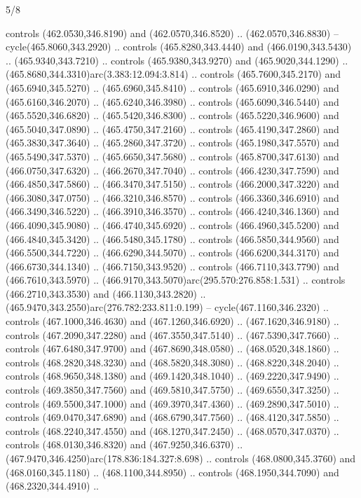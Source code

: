 \begin{flagdescription}{5/8}
\begin{scope}[xshift=0.5\flaglength,yshift=0.5\flagwidth,scale=\flagwidth/475.63]
\begin{scope}[y=0.8pt, x=0.8pt, yscale=-1, xscale=1,shift={(-450,-300)}]
\begin{scope}[cm={{1.0,0.0,0.0,1.0,(-0.0002,0.12556)}},cm={{1.0,0.0,0.0,1.0,(0.00179,0.0)}}]
\begin{scope}[cm={{1.01375,0.0,0.0,1.01375,(-5.36379,-4.94943)}}]
  controls (462.0530,346.8190) and (462.0570,346.8520) .. (462.0570,346.8830) --
  cycle(465.8060,343.2920) .. controls (465.8280,343.4440) and
  (466.0190,343.5430) .. (465.9340,343.7210) .. controls (465.9380,343.9270) and
  (465.9020,344.1290) .. (465.8680,344.3310)arc(3.383:12.094:3.814) .. controls
  (465.7600,345.2170) and (465.6940,345.5270) .. (465.6960,345.8410) .. controls
  (465.6910,346.0290) and (465.6160,346.2070) .. (465.6240,346.3980) .. controls
  (465.6090,346.5440) and (465.5520,346.6820) .. (465.5420,346.8300) .. controls
  (465.5220,346.9600) and (465.5040,347.0890) .. (465.4750,347.2160) .. controls
  (465.4190,347.2860) and (465.3830,347.3640) .. (465.2860,347.3720) .. controls
  (465.1980,347.5570) and (465.5490,347.5370) .. (465.6650,347.5680) .. controls
  (465.8700,347.6130) and (466.0750,347.6320) .. (466.2670,347.7040) .. controls
  (466.4230,347.7590) and (466.4850,347.5860) .. (466.3470,347.5150) .. controls
  (466.2000,347.3220) and (466.3080,347.0750) .. (466.3210,346.8570) .. controls
  (466.3360,346.6910) and (466.3490,346.5220) .. (466.3910,346.3570) .. controls
  (466.4240,346.1360) and (466.4090,345.9080) .. (466.4740,345.6920) .. controls
  (466.4960,345.5200) and (466.4840,345.3420) .. (466.5480,345.1780) .. controls
  (466.5850,344.9560) and (466.5500,344.7220) .. (466.6290,344.5070) .. controls
  (466.6200,344.3170) and (466.6730,344.1340) .. (466.7150,343.9520) .. controls
  (466.7110,343.7790) and (466.7610,343.5970) ..
  (466.9170,343.5070)arc(295.570:276.858:1.531) .. controls (466.2710,343.3530)
  and (466.1130,343.2820) .. (465.9470,343.2550)arc(276.782:233.811:0.199) --
  cycle(467.1160,346.2320) .. controls (467.1000,346.4630) and
  (467.1260,346.6920) .. (467.1620,346.9180) .. controls (467.2090,347.2280) and
  (467.3550,347.5140) .. (467.5390,347.7660) .. controls (467.6480,347.9700) and
  (467.8690,348.0580) .. (468.0520,348.1860) .. controls (468.2820,348.3230) and
  (468.5820,348.3080) .. (468.8220,348.2040) .. controls (468.9650,348.1380) and
  (469.1420,348.1040) .. (469.2220,347.9490) .. controls (469.3850,347.7560) and
  (469.5810,347.5750) .. (469.6550,347.3250) .. controls (469.5500,347.1000) and
  (469.3970,347.4360) .. (469.2890,347.5010) .. controls (469.0470,347.6890) and
  (468.6790,347.7560) .. (468.4120,347.5850) .. controls (468.2240,347.4550) and
  (468.1270,347.2450) .. (468.0570,347.0370) .. controls (468.0130,346.8320) and
  (467.9250,346.6370) .. (467.9470,346.4250)arc(178.836:184.327:8.698) ..
  controls (468.0800,345.3760) and (468.0160,345.1180) .. (468.1100,344.8950) ..
  controls (468.1950,344.7090) and (468.2320,344.4910) ..

\end{scope}
\end{scope}
\end{scope}
\end{scope}
\end{flagdescription}
